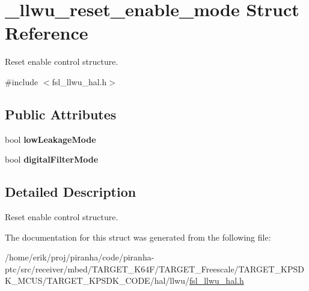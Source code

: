 \hypertarget{struct__llwu__reset__enable__mode}{}\section{\+\_\+llwu\+\_\+reset\+\_\+enable\+\_\+mode Struct Reference}
\label{struct__llwu__reset__enable__mode}


Reset enable control structure.  




{\ttfamily \#include $<$fsl\+\_\+llwu\+\_\+hal.\+h$>$}

\subsection*{Public Attributes}
\begin{DoxyCompactItemize}
\item 
bool {\bfseries low\+Leakage\+Mode}\hypertarget{struct__llwu__reset__enable__mode_ae6e5b0d928b083eb138f3c87b5fe850c}{}\label{struct__llwu__reset__enable__mode_ae6e5b0d928b083eb138f3c87b5fe850c}

\item 
bool {\bfseries digital\+Filter\+Mode}\hypertarget{struct__llwu__reset__enable__mode_aed618eb772da006e01528dc7859991b8}{}\label{struct__llwu__reset__enable__mode_aed618eb772da006e01528dc7859991b8}

\end{DoxyCompactItemize}


\subsection{Detailed Description}
Reset enable control structure. 

The documentation for this struct was generated from the following file\+:\begin{DoxyCompactItemize}
\item 
/home/erik/proj/piranha/code/piranha-\/ptc/src/receiver/mbed/\+T\+A\+R\+G\+E\+T\+\_\+\+K64\+F/\+T\+A\+R\+G\+E\+T\+\_\+\+Freescale/\+T\+A\+R\+G\+E\+T\+\_\+\+K\+P\+S\+D\+K\+\_\+\+M\+C\+U\+S/\+T\+A\+R\+G\+E\+T\+\_\+\+K\+P\+S\+D\+K\+\_\+\+C\+O\+D\+E/hal/llwu/\hyperlink{fsl__llwu__hal_8h}{fsl\+\_\+llwu\+\_\+hal.\+h}\end{DoxyCompactItemize}
